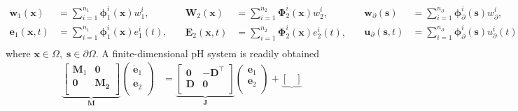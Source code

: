 \documentclass{svjour3}                     %
\newcommand{\firstRev}[1]{\textcolor{red!80!black}{#1}}
\begin{document}
	\firstRev{
		\begin{equation*}
		\begin{aligned}
		\bm{w}_1(\bm{x}) &= \sum_{i=1}^{n_1} \bm{\phi}_1^i(\bm{x}) {w}_1^i, \\
		\bm{e}_1(\bm{x},t) &= \sum_{i=1}^{n_1} \bm{\phi}_1^i(\bm{x}) {e}_1^i(t), \\
		\end{aligned} \quad
		\begin{aligned}
		\bm{W}_2(\bm{x}) &= \sum_{i=1}^{n_2} \bm{\Phi}_2^i(\bm{x}) {w}_2^i, \\
		\bm{E}_2(\bm{x},t) &= \sum_{i=1}^{n_2} \bm{\Phi}_2^i(\bm{x}) {e}_2^i(t), \\
		\end{aligned} \quad 
		\begin{aligned}
		\bm{w}_\partial(\bm{s}) &= \sum_{i=1}^{n_\partial} \bm{\phi}_\partial^i(\bm{s}) w_\partial^i, \\
		\bm{u}_\partial(\bm{s},t) &= \sum_{i=1}^{n_\partial} \bm{\phi}_\partial^i(\bm{s}) u_\partial^i(t), \\
		\end{aligned}
		\end{equation*}
		where $\bm{x} \in \Omega, \; \bm{s} \in \partial\Omega$.} A finite-dimensional pH system is readily obtained\firstRev{
		\begin{equation}\label{eq:findimEl_ex}
		\begin{aligned}
		\underbrace{\begin{bmatrix}
			\mathbf{M}_1 & \mathbf{0} \\
			\mathbf{0} & \mathbf{M_2} \\
			\end{bmatrix}}_{\mathbf{M}}
		\begin{pmatrix}
		\dot{\mathbf{e}}_1 \\
		\dot{\mathbf{e}}_2 \\
		\end{pmatrix} &= \underbrace{\begin{bmatrix}
			\mathbf{0} & -\mathbf{D}^\top \\
			\mathbf{D} & \mathbf{0} \\
			\end{bmatrix}}_{\mathbf{J}}
		\begin{pmatrix}
		\mathbf{e}_{1} \\
		\mathbf{e}_{2} \\
		\end{pmatrix} + 
		\underbrace{\begin{bmatrix}

\end{bmatrix}}
\end{aligned}
\end{equation}}
\end{document}
